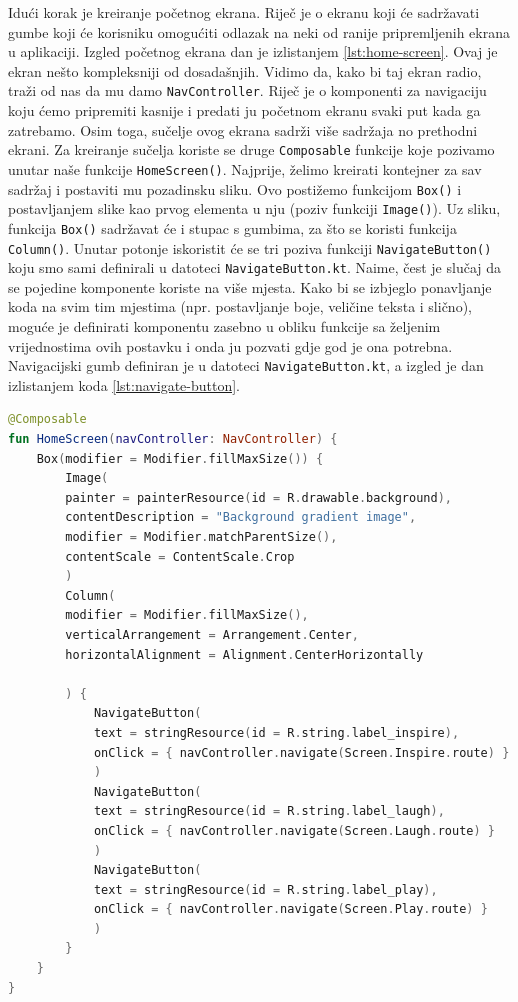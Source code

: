 \documentclass[11pt,a4paper,twoside]{article}
\begin{document}
Idući korak je kreiranje početnog ekrana. Riječ je o ekranu koji će sadržavati gumbe koji će korisniku omogućiti odlazak na neki od ranije pripremljenih ekrana u aplikaciji. Izgled početnog ekrana dan je izlistanjem \ref{lst:home-screen}. Ovaj je ekran nešto kompleksniji od dosadašnjih. Vidimo da, kako bi taj ekran radio, traži od nas da mu damo \texttt{NavController}. Riječ je o komponenti za navigaciju koju ćemo pripremiti kasnije i predati ju početnom ekranu svaki put kada ga zatrebamo. Osim toga, sučelje ovog ekrana sadrži više sadržaja no prethodni ekrani. Za kreiranje sučelja koriste se druge \texttt{Composable} funkcije koje pozivamo unutar naše funkcije \texttt{HomeScreen()}. Najprije, želimo kreirati kontejner za sav sadržaj i postaviti mu pozadinsku sliku. Ovo postižemo funkcijom \texttt{Box()} i postavljanjem slike kao prvog elementa u nju (poziv funkciji \texttt{Image()}). Uz sliku, funkcija \texttt{Box()} sadržavat će i stupac s gumbima, za što se koristi funkcija \texttt{Column()}. Unutar potonje iskoristit će se tri poziva funkciji \texttt{NavigateButton()} koju smo sami definirali u datoteci \texttt{NavigateButton.kt}. Naime, čest je slučaj da se pojedine komponente koriste na više mjesta. Kako bi se izbjeglo ponavljanje koda na svim tim mjestima (npr. postavljanje boje, veličine teksta i slično), moguće je definirati komponentu zasebno u obliku funkcije sa željenim vrijednostima ovih postavku i onda ju pozvati gdje god je ona potrebna. Navigacijski gumb definiran je u datoteci \texttt{NavigateButton.kt}, a izgled je dan izlistanjem koda \ref{lst:navigate-button}.

\begin{lstlisting}[caption={Početni ekran - HomeScreen.kt}, label={lst:screen-home}, language=Kotlin]
@Composable
fun HomeScreen(navController: NavController) {
	Box(modifier = Modifier.fillMaxSize()) {
		Image(
		painter = painterResource(id = R.drawable.background),
		contentDescription = "Background gradient image",
		modifier = Modifier.matchParentSize(),
		contentScale = ContentScale.Crop
		)
		Column(
		modifier = Modifier.fillMaxSize(),
		verticalArrangement = Arrangement.Center,
		horizontalAlignment = Alignment.CenterHorizontally
		
		) {
			NavigateButton(
			text = stringResource(id = R.string.label_inspire),
			onClick = { navController.navigate(Screen.Inspire.route) }
			)
			NavigateButton(
			text = stringResource(id = R.string.label_laugh),
			onClick = { navController.navigate(Screen.Laugh.route) }
			)
			NavigateButton(
			text = stringResource(id = R.string.label_play),
			onClick = { navController.navigate(Screen.Play.route) }
			)
		}
	}
}
\end{lstlisting}
\end{document}
